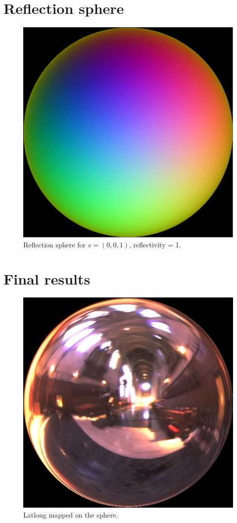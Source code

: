 \documentclass[a4paper,12pt,oneside,final]{report}
\begin{document}
\section{Reflection sphere}
\begin{figure}[!h]
\centering
\includegraphics[scale=0.7]{pictures/reflection_sphere.png}
\caption{Reflection sphere for $v=(0,0,1)$, reflectivity = 1.}
\end{figure}

\section{Final results}
\begin{figure}[!h]
\centering
\includegraphics[scale=0.9]{pictures/final.png}
\caption{Latlong mapped on the sphere.}
\end{figure}
\end{document}
